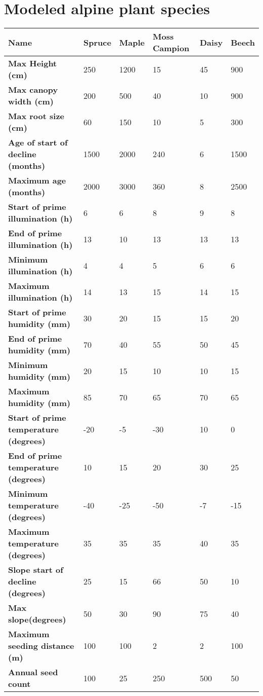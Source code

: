 \chapter{Modeled alpine plant species} \label{AppendixF}

\begin{longtable}{|p{4cm}|p{2cm}|p{2cm}|p{2cm}|p{2cm}|p{2cm}|}
		\hline		
		\textbf{Name} & \textbf{Spruce} & \textbf{Maple} & \textbf{Moss Campion} & \textbf{Daisy} & \textbf{Beech}\\
		\hline
		\textbf{Max Height (cm)} & 
		250 & 
		1200 & 
		15 & 
		45 & 
		900\\
		\hline
		\textbf{Max canopy width (cm)} & 
		200 & 
		500 & 
		40 & 
		10 & 
		900 \\
		\hline
		\textbf{Max root size (cm)} & 
		60 & 
		150 & 
		10 & 
		5 & 
		300 \\
		\hline
		\textbf{Age of start of decline (months)} & 
		1500 & 
		2000 & 
		240 & 
		6 & 
		1500 \\
		\hline
		\textbf{Maximum age (months)} & 
		2000 & 
		3000 & 
		360 & 
		8 & 
		2500 \\
		\hline
		\textbf{Start of prime illumination (h)} &
		6 & 
		6 & 
		8 & 
		9 & 
		8 \\
		\hline
		\textbf{End of prime illumination (h)} & 
		13 & 
		10 & 
		13 & 
		13 & 
		13 \\
		\hline
		\textbf{Minimum illumination (h)} & 
		4 & 
		4 & 
		5 & 
		6 & 
		6 \\
		\hline
		\textbf{Maximum illumination (h)} & 
		14 & 
		13 & 
		15 & 
		14 & 
		15 \\
		\hline
		\textbf{Start of prime humidity (mm)} & 
		30 & 
		20 & 
		15 & 
		15 & 
		20 \\
		\hline
		\textbf{End of prime humidity (mm)} & 
		70 & 
		40 & 
		55 & 
		50 & 
		45 \\
		\hline
		\textbf{Minimum humidity (mm)} &
		20 & 
		15 & 
		10 & 
		10 & 
		15 \\
		\hline
		\textbf{Maximum humidity (mm)} & 
		85 & 
		70 & 
		65 & 
		70 & 
		65 \\
		\hline
		\textbf{Start of prime temperature (degrees)} & 
		-20 & 
		-5 & 
		-30 & 
		10 & 
		0 \\
		\hline
		\textbf{End of prime temperature (degrees)} & 
		10 & 
		15 & 
		20 & 
		30 & 
		25 \\
		\hline
		\textbf{Minimum temperature (degrees)} & 
		-40 & 
		-25 & 
		-50 & 
		-7 & 
		-15 \\
		\hline
		\textbf{Maximum temperature (degrees)} & 
		35 & 
		35 & 
		35 & 
		40 & 
		35 \\
		\hline
		\textbf{Slope start of decline (degrees)} & 
		25 & 
		15 & 
		66 & 
		50 & 
		10 \\
		\hline
		\textbf{Max slope(degrees)} & 
		50 & 
		30 & 
		90 & 
		75 & 
		40 \\
		\hline
		\textbf{Maximum seeding distance (m)} & 
		100 & 
		100 & 
		2 & 
		2 & 
		100 \\
		\hline
		\textbf{Annual seed count} & 
		100 & 
		25 & 
		250 & 
		500 & 
		50 \\
		\hline                                                                           
\end{longtable}